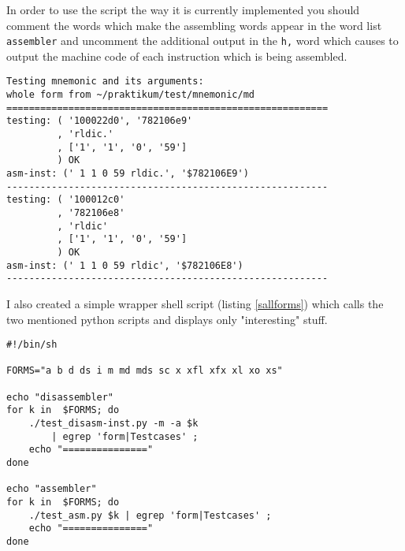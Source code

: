 In order to use the script the way it is currently implemented you should
comment the words which make the assembling words appear in the word list
\texttt{assembler} and uncomment the additional output in the \texttt{h,} word
which causes to output the machine code of each instruction which is being
assembled.

\begin{lstlisting}[float, caption=Output of test\_asm.py, label=saout]
Testing mnemonic and its arguments:
whole form from ~/praktikum/test/mnemonic/md
=========================================================
testing: ( '100022d0', '782106e9'
         , 'rldic.'
         , ['1', '1', '0', '59']
         ) OK
asm-inst: (' 1 1 0 59 rldic.', '$782106E9')
---------------------------------------------------------
testing: ( '100012c0'
         , '782106e8'
         , 'rldic'
         , ['1', '1', '0', '59']
         ) OK
asm-inst: (' 1 1 0 59 rldic', '$782106E8')
---------------------------------------------------------
\end{lstlisting}

I also created a simple wrapper shell script (listing \ref{sallforms}) which 
calls the two mentioned python scripts and displays only "interesting" stuff.

\begin{lstlisting}[caption=Script: test\_all\_forms.sh, label=sallforms]
#!/bin/sh

FORMS="a b d ds i m md mds sc x xfl xfx xl xo xs"

echo "disassembler"
for k in  $FORMS; do
    ./test_disasm-inst.py -m -a $k 
        | egrep 'form|Testcases' ;
    echo "==============="
done

echo "assembler"
for k in  $FORMS; do
    ./test_asm.py $k | egrep 'form|Testcases' ;
    echo "==============="
done
\end{lstlisting}
